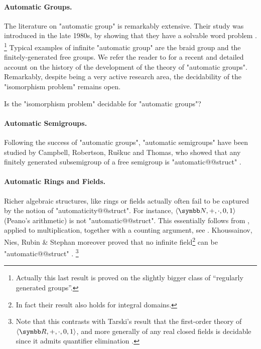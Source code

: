 \paragraph*{Automatic Groups.}
The literature on "automatic group" is remarkably extensive.
Their study was introduced in the late 1980s,
by showing that they have a solvable word problem \cite[Theorem~2.1.9]{Epstein1992Word}.%
\footnote{Actually this last result is proved on the slightly bigger class of ``regularly generated groups''.}
Typical examples of infinite "automatic group" are the braid group
\cite[Theorem~9.3.1]{Epstein1992Word} and the finitely-generated free groups.
We refer the reader to \cite{Rees2022AutomaticGroups} for a recent and detailed account on
the history of the development of the theory of "automatic groups".
Remarkably, despite being a very active research area, the decidability of
the "isomorphism problem" remains open.

\begin{openproblem}
	Is the "isomorphism problem" decidable for "automatic groups"?
\end{openproblem}

\paragraph*{Automatic Semigroups.}
Following the success of "automatic groups",
"automatic semigroups" have been studied by Campbell,
Robertson, Ru\v{s}kuc and Thomas, who showed
that any finitely generated subsemigroup of a free semigroup
is "automatic@@struct"
\cite[Theorem~8.1]{CampbellRobertsonRuskucThomas2001AutomaticSemigroups}.

\paragraph*{Automatic Rings and Fields.}
Richer algebraic structures, like rings or fields actually often fail to be captured by
the notion of "automaticity@@struct". For instance, $\tup{\N,{+},{\cdot},0,1}$ (Peano's arithmetic)
is not "automatic@@struct".
This essentially follows from , applied to multiplication,
together with a counting argument, see \cite[Corollary~XII.8.11]{Blumensath2024MSOModelTheory}.
Khoussainov, Nies, Rubin \& Stephan moreover proved that no infinite field\footnote{In fact their result also holds for integral domains.} can be "automatic@@struct"
\cite[Theorem~3.10 \& Corollary~3.11]{JainKhoussainovSchlichtStephan2019IsomorphismTreeAutomaticOrdinals}.%
\footnote{Note that this contrasts with Tarski's result that the first-order theory
of $\tup{\R,+,\cdot,0,1}$, and more generally of any real closed fields is 
decidable since it admits quantifier elimination \cite[Theorem~8.4.4]{Hodges1993ModelTheory}.}


